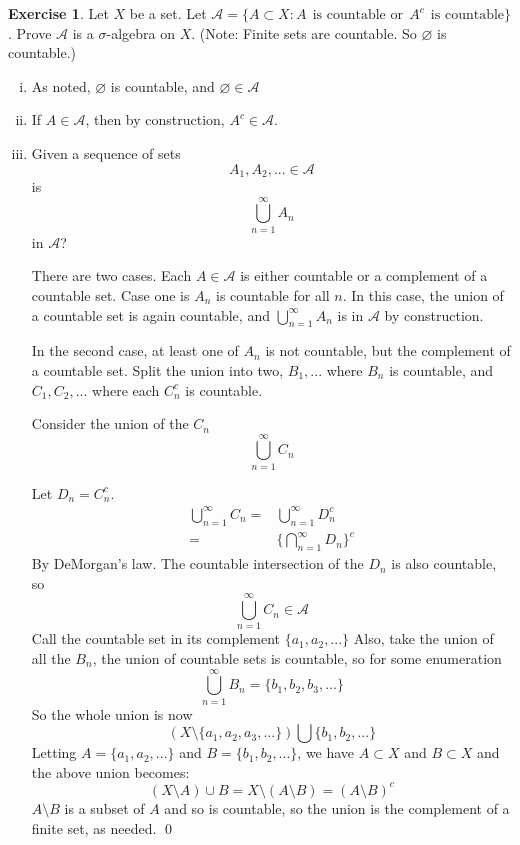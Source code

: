 \documentclass[11pt,oneside]{article}
\numberwithin{equation}{section}
\theoremstyle{definition}
\newtheorem{exercise}{Exercise}
\def\calA{\mathcal{A}}
\begin{document}
\begin{exercise}
  Let $X$ be a set. Let $ \calA = \{A \subset X : A \ \ \text{is 
    countable or} \ \ A^c \ \ \text{is countable} \}$.  Prove $\calA$ is a
    $\sigma$-algebra on $X$. (Note: Finite sets are countable. So
    $\varnothing$ is countable.)
\end{exercise}
\begin{solution}
  \begin{enumerate}[(i)]
    \item
      As noted, $\varnothing $ is countable, and $\varnothing \in \calA$
    \item
      If $A \in \calA$, then by construction, $A^c \in \calA$.
    \item
      Given a sequence of sets
      $$
      A_1, A_2, ... \in \calA
      $$
      is
      $$ \bigcup _ {n =1} ^ \infty A_n
      $$ in $\calA$?

      There are two cases.  Each $A \in \calA$ is either countable or
      a complement of a countable set.  Case one is $A_n$ is countable
      for all $n$.  In this case, the union of a countable set is again countable, and
      $ \bigcup _ {n =1} ^ \infty A_n $ is in $\calA$ by construction.

      In the second case, at least one of $A_n$ is not countable, but
      the complement of a countable set.  Split the union into two,
      $B_1, ... $ where $B_n$ is countable, and $C_1, C_2,...$ where
      each $C_n^c$ is countable.

      Consider the union of the $C_n$
      $$
      \bigcup _ {n=1}^\infty C_n
      $$

      Let $D_n = C_n ^c$.  
      \begin{align*}
      \bigcup _ {n=1}^\infty C_n = & \bigcup _ {n=1}^\infty D_n^c \\ 
      = &  \{ \bigcap _{n=1}^\infty D_n \} ^ c
      \end{align*}
      By DeMorgan's law.  The countable intersection of the $D_n$ is
      also countable, so
      $$
      \bigcup _ {n=1}^\infty C_n \in \calA
      $$
      Call the countable set in its complement $ \{ a_1, a_2, ... \}$
      Also, take the union of all the $B_n$, the union of countable sets
      is countable, so for some enumeration
      $$
      \bigcup _{n=1}^\infty B_n = \{ b_1, b_2, b_3, ... \}
      $$
      So the whole union is now
      $$
      ( X \setminus \{a_1, a_2, a_3, ... \}) \bigcup \{b_1, b_2, ... \}
      $$
      Letting $ A = \{ a_1, a_2, ... \}$ and 
      $ B = \{ b_1, b_2, ... \} $, we have $A \subset X $ and $B \subset X$ and the
      above union becomes:
      $$
      (X \setminus A ) \cup B = X \setminus ( A \setminus B) = (A \setminus B) ^c
      $$
      $A \setminus B$ is a subset of $A$ and so is countable, so the union is the complement of a
      finite set, as needed.  \qed

      
      
  \end{enumerate}

\end{solution}
\end{document}
